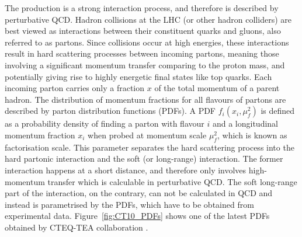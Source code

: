 The \ttbar production is a strong interaction process, and therefore is described by perturbative QCD. Hadron collisions
at the LHC (or other hadron colliders) are best viewed as interactions between their constituent quarks and gluons, also
referred to as partons. Since collisions occur at high energies, these interactions result in hard scattering processes
between incoming partons, meaning those involving a significant momentum transfer comparing to the proton mass, and
potentially giving rise to highly energetic final states like top quarks. Each incoming parton carries only a fraction
$x$ of the total momentum of a parent hadron. The distribution of momentum fractions for all flavours of partons are
described by parton distribution functions (PDFs). A PDF $f_i(x_i,\mu_f^2)$ is defined as a probability density of
finding a parton with flavour $i$ and a longitudinal momentum fraction $x_i$ when probed at momentum scale $\mu_f^2$,
which is known as factorisation scale. This parameter separates the hard scattering process into the hard partonic
interaction and the soft (or long-range) interaction. The former interaction happens at a short distance, and therefore
only involves high-momentum transfer which is calculable in perturbative QCD. The soft long-range part of the
interaction, on the contrary, can not be calculated in QCD and instead is parametrised by the PDFs, which have to be
obtained from experimental data. Figure~\ref{fig:CT10_PDFs} shows one of the latest PDFs obtained by CTEQ-TEA
collaboration \autocite{CT10_NNLO}.

